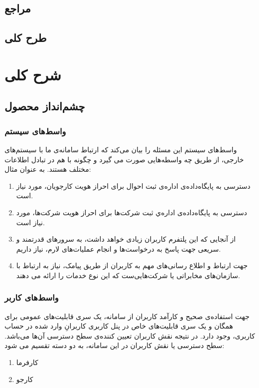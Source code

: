 \documentclass{report}
\begin{document}
			\subsection{مراجع}
			\subsection{طرح کلی}
		\section{شرح کلی}
			\subsection{چشم‌انداز محصول}
				\subsubsection{واسط‌های سیستم}
					واسط‌های سیستم این مسئله را بیان می‌کند که ارتباط سامانه‌ی ما با سیستم‌های خارجی، از طریق چه واسطه‌هایی صورت می گیرد و چگونه با هم در تبادل اطلاعات مختلف هستند. به عنوان مثال:
					\begin{enumerate}
						\item 
	دسترسی به پایگاه‌داده‌ی اداره‌ی ثبت احوال برای احراز هویت کارجو‌یان، مورد نیاز است.
						\item 
	دسترسی به پایگاه‌داده‌ی اداره‌ي ثبت شرکت‌ها برای احراز هویت شرکت‌ها، مورد نیاز است.
						\item 
	از آنجایی که این پلتفرم کاربران زیادی خواهد داشت، به سرور‌های قدرتمند و سریعی جهت پاسخ به درخواست‌ها و انجام عملیات‌های لارم، نیاز داریم.
						\item 
	جهت ارتباط و اطلاع رسانی‌های مهم به کاربران از طریق پیامک، نیاز به ارتباط با سازمان‌های مخابراتی یا شرکت‌هایی‌ست که این نوع خدمات را ارائه می دهند.
					\end{enumerate}
				\subsubsection{واسط‌های کاربر}
					جهت استفاده‌ی صحیح و کارآمد کاربران از سامانه، یک سری قابلیت‌های عمومی برای همگان و یک سری قابلیت‌های خاص در پنل کاربری کاربرانِ وارد شده در حساب کاربری، وجود دارد. در نتیجه نقش کاربران تعیین کننده‌ی سطح دسترسی آن‌ها می‌باشد. 
					سطح‌ دسترسی یا نقش کاربران در این سامانه، به دو دسته تقسیم می شود:
					\begin{enumerate}
						\item کارفرما
						\item کارجو
					\end{enumerate}
\end{document}
